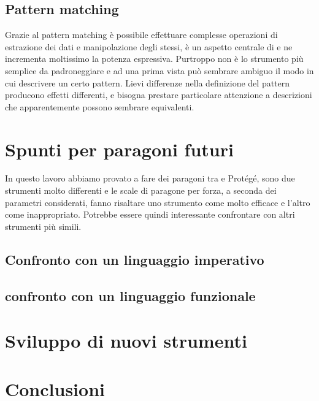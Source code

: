 \subsection{Pattern matching}
Grazie al pattern matching è possibile effettuare complesse operazioni di estrazione dei dati e manipolazione degli stessi, è un aspetto centrale di \cduce e ne incrementa moltissimo la potenza espressiva. Purtroppo non è lo strumento più semplice da padroneggiare e ad una prima vista può sembrare ambiguo il modo in cui descrivere un certo pattern. Lievi differenze nella definizione del pattern producono effetti differenti, e bisogna prestare particolare attenzione a descrizioni che apparentemente possono sembrare equivalenti.
\section{Spunti per paragoni futuri}
In questo lavoro abbiamo provato a fare dei paragoni tra \cduce e Protégé, sono due strumenti molto differenti e le scale di paragone per forza, a seconda dei parametri considerati, fanno risaltare uno strumento come molto efficace e l'altro come inappropriato. Potrebbe essere quindi interessante confrontare \cduce con altri strumenti più simili.
\subsection{Confronto con un linguaggio imperativo}

\subsection{confronto con un linguaggio funzionale}
\section{Sviluppo di nuovi strumenti}\label{ch5.4}
\section{Conclusioni}

